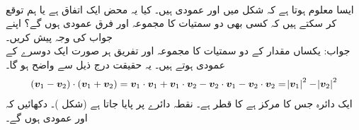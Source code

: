 \\
\quad
ایسا معلوم ہوتا ہے کہ شکل  میں  اور  عمودی ہیں۔ کیا یہ محض ایک اتفاق ہے یا ہم توقع کر سکتے ہیں کہ کسی بھی دو سمتیات کا مجموعہ اور فرق عمودی ہوں گے؟ اپنے جواب کی وجہ پیش کریں۔\\
جواب:\quad
یکساں مقدار کے دو سمتیات کا مجموعہ اور تفریق ہر صورت ایک دوسرے کے عمودی  ہوتے ہیں۔ یہ حقیقت درج ذیل سے واضح ہو گا۔
\begin{align*}
({{\boldsymbol{v}}}_1-{{\boldsymbol{v}}}_2)\cdot({{\boldsymbol{v}}}_1+{{\boldsymbol{v}}}_2)={{\boldsymbol{v}}}_1\cdot{\ensuremath{{\boldsymbol{v}}}}_1+{{\boldsymbol{v}}}_1\cdot{\ensuremath{{\boldsymbol{v}}}}_2-{{\boldsymbol{v}}}_2\cdot{\ensuremath{{\boldsymbol{v}}}}_1-{{\boldsymbol{v}}}_2\cdot{\ensuremath{{\boldsymbol{v}}}}_2=\abs{{{\boldsymbol{v}}}_1}^2-\abs{{{\boldsymbol{v}}}_2}^2
\end{align*}
ایک دائرہ جس کا مرکز   ہے کا قطر  ہے۔ نقطہ  دائرے پر پایا جاتا ہے (شکل )۔ دکھائیں کہ  اور  عمودی ہوں گے۔
